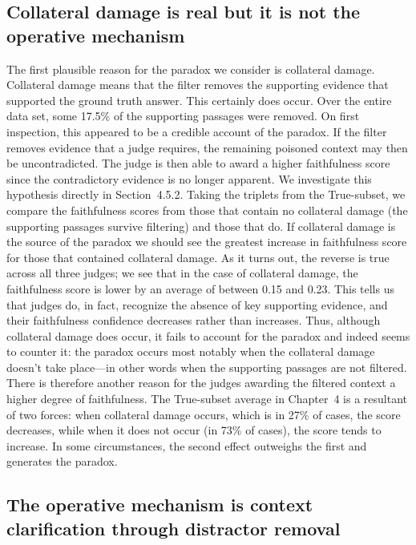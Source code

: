 \subsection{Collateral damage is real but it is not the operative mechanism}

The first plausible reason for the paradox we consider is collateral damage. Collateral damage means that the filter removes the supporting evidence that supported the ground truth answer. This certainly does occur. Over the entire data set, some 17.5\% of the supporting passages were removed.
On first inspection, this appeared to be a credible account of the paradox. If the filter removes evidence that a judge requires, the remaining poisoned context may then be uncontradicted. The judge is then able to award a higher faithfulness score since the contradictory evidence is no longer apparent.
We investigate this hypothesis directly in Section~4.5.2. Taking the triplets from the True-subset, we compare the faithfulness scores from those that contain no collateral damage (the supporting passages survive filtering) and those that do. If collateral damage is the source of the paradox we should see the greatest increase in faithfulness score for those that contained collateral damage.
As it turns out, the reverse is true across all three judges; we see that in the case of collateral damage, the faithfulness score is lower by an average of between 0.15 and 0.23. This tells us that judges do, in fact, recognize the absence of key supporting evidence, and their faithfulness confidence decreases rather than increases.
Thus, although collateral damage does occur, it fails to account for the paradox and indeed seems to counter it: the paradox occurs most notably when the collateral damage doesn't take place---in other words when the supporting passages are not filtered. There is therefore another reason for the judges awarding the filtered context a higher degree of faithfulness.
The True-subset average in Chapter~4 is a resultant of two forces: when collateral damage occurs, which is in 27\% of cases, the score decreases, while when it does not occur (in 73\% of cases), the score tends to increase. In some circumstances, the second effect outweighs the first and generates the paradox.


\subsection{The operative mechanism is context clarification through distractor removal}

